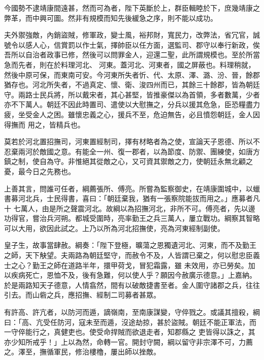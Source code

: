 \begin{pinyinscope}
 今國勢不逮靖康間遠甚，然而可為者，陛下英斷於上，群臣輯睦於下，庶幾靖康之弊革，而中興可圖。然非有規模而知先後緩急之序，則不能以成功。



 夫外禦強敵，內銷盜賊，修軍政，變士風，裕邦財，寬民力，改弊法，省冗官，誠號令以感人心，信賞罰以作士氣，擇帥臣以任方面，選監司、郡守以奉行新政，俟吾所以自治者政事已修，然後可以問罪金人，迎還二聖，此所謂規模也。至於所當急而先者，則在於料理河北、
 河東。蓋河北、河東者，國之屏蔽也。料理稍就，然後中原可保，而東南可安。今河東所失者忻、代、太原、澤、潞、汾、晉，餘郡猶存也。河北所失者，不過真定、懷、衛、浚四州而已，其餘三十餘郡，皆為朝廷守。兩路士民兵將，所以戴宋者，其心甚堅，皆推豪傑以為首領，多者數萬，少者亦不下萬人。朝廷不因此時置司、遣使以大慰撫之，分兵以援其危急，臣恐糧盡力疲，坐受金人之困。雖懷忠義之心，援兵不至，危迫無告，必且憤怨朝廷，金人因得撫而
 用之，皆精兵也。



 莫若於河北置招撫司，河東置經制司，擇有材略者為之使，宣論天子恩德、所以不忍棄兩河於敵國之意。有能全一州、復一郡者，以為節度、防禦、團練使，如唐方鎮之制，使自為守。非惟絕其從敵之心，又可資其禦敵之力，使朝廷永無北顧之憂，最今日之先務也。



 上善其言，問誰可任者，綱薦張所、傅亮。所嘗為監察御史，在靖康圍城中，以蠟書募河北兵，士民得書，喜曰：「朝廷棄我，猶有一張察院能拔而用之。」應募者凡十
 七萬人，由是所之聲震河北。故綱以為招撫河北，非所不可。傅亮者，先以邊功得官，嘗治兵河朔。都城受圍時，亮率勤王之兵三萬人，屢立戰功。綱察其智略可以大用，欲因此試之。上乃以所為河北招撫使，亮為河東經制副使。



 皇子生，故事當肆赦。綱奏：「陛下登極，曠蕩之恩獨遺河北、河東，而不及勤王之師，天下觖望。夫兩路為朝廷堅守，而赦令不及，人皆謂已棄之，何以慰忠臣義士之心？勤王之師在道路半年，擐甲荷戈，冒犯霜露，雖
 未效用，亦已勞矣。加以疾病死亡，恩恤不及，後有急難，何以使人乎？願因今赦廣示德意。」上嘉納。於是兩路知天子德意，人情翕然，間有以破敵捷書至者。金人圍守諸郡之兵，往往引去。而山砦之兵，應招撫、經制二司募者甚眾。



 有許高、許亢者，以防河而遁，謫嶺南，至南康謀變，守倅戮之。或議其擅殺，綱曰：「高、亢受任防河，寇未至而遁，沒途劫掠，甚於盜賊。朝廷不能正軍法，而一守倅能行之，真健吏也。使受命捍賊而欲退走者，知郡縣之
 吏皆得以誅之，其亦少知所戒乎！」上以為然，命轉一官。開封守闕，綱以留守非宗澤不可，力薦之。澤至，撫循軍民，修治樓櫓，屢出師以挫敵。




\end{pinyinscope}
